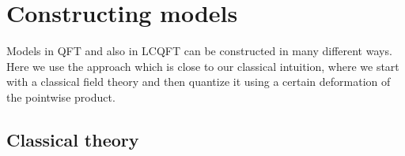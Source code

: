 \documentclass[12pt]{article}
\newcommand{\fA}{\mathfrak{A}}
\newcommand{\RR}{\mathbb{R}}           %
\newcommand{\De}{\Delta}
\newcommand{\1}{\mathds{1}}                         %
\begin{document}
{%
\section{Constructing models}
Models in QFT and also in LCQFT can be constructed in many different ways. Here we use the approach which is close to our classical intuition, where we start with a classical field theory and then quantize it using a certain deformation of the pointwise product. 
\subsection{Classical theory}
}
\end{document}
